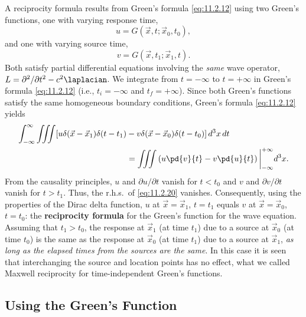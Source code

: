 A reciprocity formula results from Green's formula \eqref{eq:11.2.12} using two Green's functions, one with varying response time,
\begin{equation}
\label{eq:11.2.18}
u = G(\vec{x},t;\vec{x}_0,t_0),
\end{equation}
and one with varying source time,
\begin{equation}
\label{eq:11.2.19}
v = G(\vec{x},t_1;\vec{x}_1,t).
\end{equation}
Both satisfy partial differential equations involving the \emph{same} wave operator, $L = \partial^2/\partial t^2 - c^2\laplacian$.  We integrate from $t = -\infty$ to $t = +\infty$ in Green's formula \eqref{eq:11.2.12} (i.e., $t_i = -\infty$ and $t_f = +\infty$).  Since both Green's functions satisfy the same homogeneous boundary conditions, Green's formula \eqref{eq:11.2.12} yields
\begin{equation}
\label{eq:11.2.20}
\begin{split}
\int_{-\infty}^{\infty} \iiint [u\delta(\vec{x} - \vec{x}_1)\delta(t - t_1) &- v\delta(\vec{x} - \vec{x}_0)\delta(t - t_0)]\,d^3x\,dt \\
&= \iiint \left(u\pd{v}{t} - v\pd{u}{t}\right)\bigg|_{-\infty}^{+\infty} d^3x.
\end{split}
\end{equation}
From the causality principles, $u$ and $\partial u/\partial t$ vanish for $t < t_0$ and $v$ and $\partial v/\partial t$ vanish for $t > t_1$.  Thus, the r.h.s.\ of \eqref{eq:11.2.20} vanishes.  Consequently, using the properties of the Dirac delta function, $u$ at $\vec{x} = \vec{x}_1$, $t = t_1$ equals $v$ at $\vec{x} = \vec{x}_0$, $t = t_0$:
the \textbf{reciprocity formula} for the Green's function for the wave equation.  Assuming that $t_1 > t_0$, the response at $\vec{x}_1$ (at time $t_1$) due to a source at $\vec{x}_0$ (at time $t_0$) is the same as the response at $\vec{x}_0$ (at time $t_1$) due to a source at $\vec{x}_1$, \emph{as long as the elapsed times from the sources are the same}.  In this case it is seen that interchanging the source and location points has no effect, what we called Maxwell reciprocity for time-independent Green's functions.

\subsection{Using the Green's Function}
\label{subsec:using-greens-wave}

